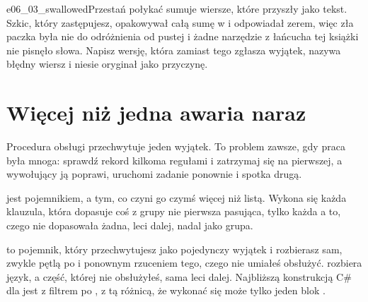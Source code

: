 \begin{exercise}{e06_03_swallowed}{Przestań połykać}
 sumuje wiersze, które przyszły jako tekst. Szkic, który
zastępujesz, opakowywał całą sumę w  i odpowiadał
zerem, więc zła paczka była nie do odróżnienia od pustej i żadne narzędzie z
łańcucha tej książki nie pisnęło słowa. Napisz wersję, która zamiast tego
zgłasza wyjątek, nazywa błędny wiersz i niesie oryginał jako przyczynę.
\end{exercise}

\section{Więcej niż jedna awaria naraz}
\label{sec:ch06-groups}

Procedura obsługi przechwytuje jeden wyjątek. To problem zawsze, gdy praca
była mnoga: sprawdź rekord kilkoma regułami i zatrzymaj się na pierwszej, a
wywołujący ją poprawi, uruchomi zadanie ponownie i spotka drugą.


\noindent
{} jest pojemnikiem, a  tym, co czyni go
czymś więcej niż listą. Wykona się każda klauzula, która dopasuje coś z grupy
\dash{} nie pierwsza pasująca, tylko każda \dash{} a to, czego nie dopasowała
żadna, leci dalej, nadal jako grupa.



\begin{csbox}
 to pojemnik, który przechwytujesz jako pojedynczy
wyjątek i rozbierasz sam, zwykle pętlą po  i ponownym
rzuceniem tego, czego nie umiałeś obsłużyć.  rozbiera
język, a część, której nie obsłużyłeś, sama leci dalej. Najbliższą
konstrukcją C\# dla  jest  z filtrem  po
, z tą różnicą, że wykonać się może tylko jeden blok
.
\end{csbox}


